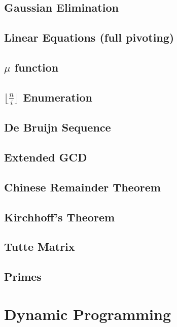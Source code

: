 \documentclass[a4paper,10pt,twocolumn,oneside]{article}
\begin{document}
\subsection{Gaussian Elimination}

\subsection{Linear Equations (full pivoting)}

\subsection{$\mu$ function}

\subsection{$\lfloor \frac{n}{i} \rfloor$ Enumeration}

\subsection{De Bruijn Sequence}

\subsection{Extended GCD}

\subsection{Chinese Remainder Theorem}

% 
\subsection{Kirchhoff's Theorem}

\subsection{Tutte Matrix}

\subsection{Primes}

\section{Dynamic Programming}
\end{document}
